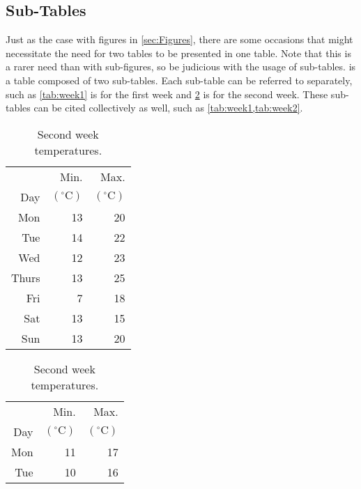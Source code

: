 \subsection{Sub-Tables}
Just as the case with figures in \cref{sec:Figures}, there are some occasions that might necessitate the need for two tables to be presented in one table.
Note that this is a rarer need than with sub-figures, so be judicious with the usage of sub-tables.
 is a table composed of two sub-tables.
Each sub-table can be referred to separately, such as \cref{tab:week1} is for the first week and \cref{tab:week2} is for the second week.
These sub-tables can be cited collectively as well, such as \cref{tab:week1,tab:week2}.
\begin{table}
	\begin{subtable}[h]{0.375\textwidth}
		\centering
		\caption{First week temperatures.}
		\label{tab:week1}
		\begin{tabular}{r r r}
			      & Min.                          & Max. \\
			Day   & $\left(^\circ\text{C}\right)$
			      & $\left(^\circ\text{C}\right)$        \\
			\hline
			Mon   & 13                            & 20   \\
			Tue   & 14                            & 22   \\
			Wed   & 12                            & 23   \\
			Thurs & 13                            & 25   \\
			Fri   & 7                             & 18   \\
			Sat   & 13                            & 15   \\
			Sun   & 13                            & 20   \\
			\hline
		\end{tabular}
	\end{subtable}
	\hspace{0.2in}
	\begin{subtable}[h]{0.375\textwidth}
		\caption{Second week temperatures.}
		\label{tab:week2}
		\centering
		\begin{tabular}{r r r}
			      & Min.                          & Max. \\
			Day   & $\left(^\circ\text{C}\right)$
			      & $\left(^\circ\text{C}\right)$        \\
			\hline
			Mon   & 11                            & 17   \\
			Tue   & 10                            & 16   \\

\end{tabular}
\end{subtable}
\end{table}
